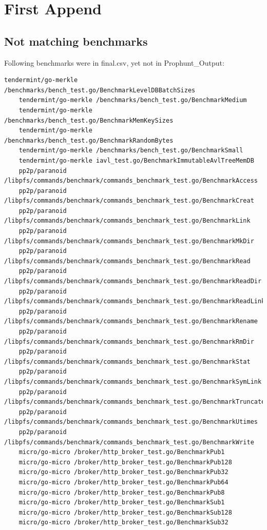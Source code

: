\documentclass{seal_thesis}
\begin{document}
\appendix
\chapter{First Append}
\section{Not matching benchmarks}
\label{infinalbutnotincsv1}
Following benchmarks were in final.csv, yet not in Prophunt\_Output:
\begin{lstlisting}[basicstyle=\tiny]
	tendermint/go-merkle /benchmarks/bench_test.go/BenchmarkLevelDBBatchSizes
	tendermint/go-merkle /benchmarks/bench_test.go/BenchmarkMedium
	tendermint/go-merkle /benchmarks/bench_test.go/BenchmarkMemKeySizes
	tendermint/go-merkle /benchmarks/bench_test.go/BenchmarkRandomBytes
	tendermint/go-merkle /benchmarks/bench_test.go/BenchmarkSmall
	tendermint/go-merkle iavl_test.go/BenchmarkImmutableAvlTreeMemDB
	pp2p/paranoid /libpfs/commands/benchmark/commands_benchmark_test.go/BenchmarkAccess
	pp2p/paranoid /libpfs/commands/benchmark/commands_benchmark_test.go/BenchmarkCreat
	pp2p/paranoid /libpfs/commands/benchmark/commands_benchmark_test.go/BenchmarkLink
	pp2p/paranoid /libpfs/commands/benchmark/commands_benchmark_test.go/BenchmarkMkDir
	pp2p/paranoid /libpfs/commands/benchmark/commands_benchmark_test.go/BenchmarkRead
	pp2p/paranoid /libpfs/commands/benchmark/commands_benchmark_test.go/BenchmarkReadDir
	pp2p/paranoid /libpfs/commands/benchmark/commands_benchmark_test.go/BenchmarkReadLink
	pp2p/paranoid /libpfs/commands/benchmark/commands_benchmark_test.go/BenchmarkRename
	pp2p/paranoid /libpfs/commands/benchmark/commands_benchmark_test.go/BenchmarkRmDir
	pp2p/paranoid /libpfs/commands/benchmark/commands_benchmark_test.go/BenchmarkStat
	pp2p/paranoid /libpfs/commands/benchmark/commands_benchmark_test.go/BenchmarkSymLink
	pp2p/paranoid /libpfs/commands/benchmark/commands_benchmark_test.go/BenchmarkTruncate
	pp2p/paranoid /libpfs/commands/benchmark/commands_benchmark_test.go/BenchmarkUtimes
	pp2p/paranoid /libpfs/commands/benchmark/commands_benchmark_test.go/BenchmarkWrite
	micro/go-micro /broker/http_broker_test.go/BenchmarkPub1
	micro/go-micro /broker/http_broker_test.go/BenchmarkPub128
	micro/go-micro /broker/http_broker_test.go/BenchmarkPub32
	micro/go-micro /broker/http_broker_test.go/BenchmarkPub64
	micro/go-micro /broker/http_broker_test.go/BenchmarkPub8
	micro/go-micro /broker/http_broker_test.go/BenchmarkSub1
	micro/go-micro /broker/http_broker_test.go/BenchmarkSub128
	micro/go-micro /broker/http_broker_test.go/BenchmarkSub32

\end{lstlisting}
\end{document}
